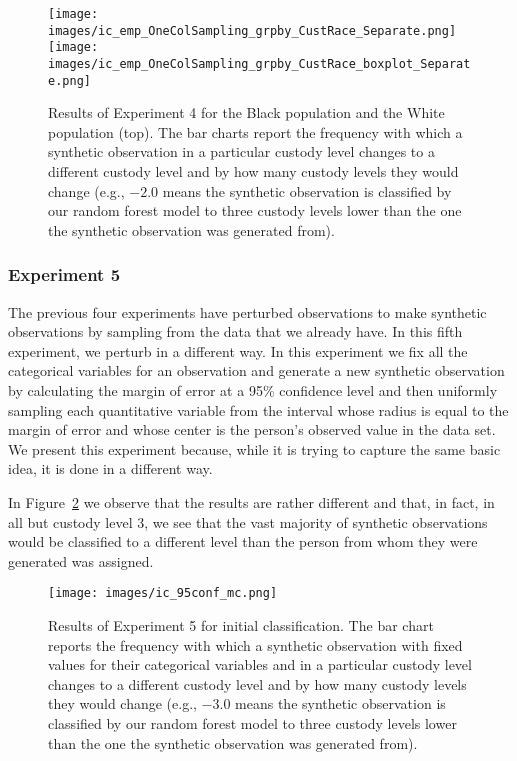 \documentclass{amsproc}
\numberwithin{equation}{section}
\theoremstyle{plain}
\theoremstyle{remark}
\begin{document}
\begin{figure}
\centering
\texttt{[image: images/ic\_emp\_OneColSampling\_grpby\_CustRace\_Separate.png]}
\\
\texttt{[image: images/ic\_emp\_OneColSampling\_grpby\_CustRace\_boxplot\_Separate.png]}
\caption{Results of Experiment 4 for the Black population and the White population (top).  The bar charts report the frequency with which a synthetic observation in a particular custody level changes to a different custody level and by how many custody levels they would change (e.g., $-2.0$ means the synthetic observation is classified by our random forest model to three custody levels lower than the one the synthetic observation was generated from).}\label{fig:one-col-by-CL-and-race}
\end{figure}

\subsubsection{Experiment 5} The previous four experiments have perturbed observations to make synthetic observations by sampling from the data that we already have.  In this fifth experiment, we perturb in a different way.  In this experiment we fix all the categorical variables for an observation and generate a new synthetic observation by calculating the margin of error at a 95\% confidence level and then uniformly sampling each quantitative variable from the interval whose radius is equal to the margin of error and whose center is the person's observed value in the data set.  We present this experiment because, while it is trying to capture the same basic idea, it is done in a different way.

In Figure~\ref{fig:95conf-by-CL} we observe that the results are rather different and that, in fact, in all but custody level 3, we see that the vast majority of synthetic observations would be classified to a different level than the person from whom they were generated was assigned.  

\begin{figure}
\centering
\texttt{[image: images/ic\_95conf\_mc.png]}
\caption{Results of Experiment 5 for initial classification.  The bar chart reports the frequency with which a synthetic observation with fixed values for their categorical variables and in a particular custody level changes to a different custody level and by how many custody levels they would change (e.g., $-3.0$ means the synthetic observation is classified by our random forest model to three custody levels lower than the one the synthetic observation was generated from).}\label{fig:95conf-by-CL}
\end{figure}
\end{document}
